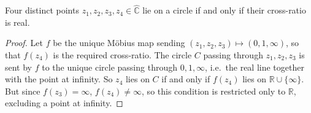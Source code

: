 \begin{corollary}
	Four distinct points \(z_1, z_2, z_3, z_4 \in \hat{\mathbb C}\) lie on a circle if and only if their cross-ratio is real.
\end{corollary}
\begin{proof}
	Let \(f\) be the unique M\"obius map sending \((z_1, z_2, z_3) \mapsto (0, 1, \infty)\), so that \(f(z_4)\) is the required cross-ratio.
	The circle \(C\) passing through \(z_1, z_2, z_3\) is sent by \(f\) to the unique circle passing through \(0, 1, \infty\), i.e.\ the real line together with the point at infinity.
	So \(z_4\) lies on \(C\) if and only if \(f(z_4)\) lies on \(\mathbb R \cup \{ \infty \}\).
	But since \(f(z_3) = \infty\), \(f(z_4) \neq \infty\), so this condition is restricted only to \(\mathbb R\), excluding a point at infinity.
\end{proof}

